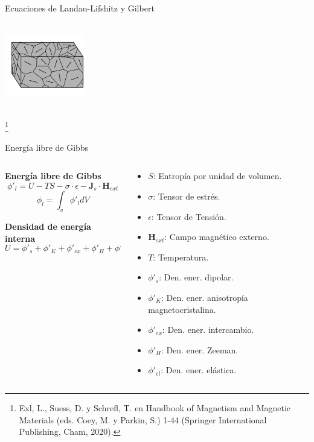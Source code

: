 \documentclass{beamer}
\newcommand\blfootnote[1]{%
  \begingroup
  \renewcommand\thefootnote{}\footnote{#1}%
  \addtocounter{footnote}{-1}%
  \endgroup
}
\begin{document}
\begin{frame}{Ecuaciones de Landau-Lifshitz y Gilbert}
\begin{columns}
\begin{column}{0.5\textwidth}
            \centering
            \includegraphics[width=3.5cm,height=3cm]{../Figuras/MagneticDomain.png}
    \end{column}
    \end{columns}
    \blfootnote{{\tiny Exl, L., Suess, D. y Schrefl, T. en Handbook of Magnetism and Magnetic Materials (eds. Coey, M. y Parkin, S.) 1-44 (Springer International Publishing, Cham, 2020).}}
\end{frame}

\begin{frame}{Energía libre de Gibbs}
        \begin{columns}
    \begin{column}{0.5\textwidth}
    \footnotesize
        \textbf{Energía libre de Gibbs}
        \[ \phi'_l = U - T S - \sigma \cdot \epsilon - \bm{J}_s \cdot \bm{H}_{ext}\]
        \[ \phi_l = \int_v \phi'_l dV \]

        \vspace{0.7cm}
        
        \textbf{Densidad de energía interna}
        \[ U = \phi'_s + \phi'_K + \phi'_{ex} + \phi'_H + \phi'_{el}  \]
    \end{column}
    \begin{column}{0.5\textwidth}
    \scriptsize
        \begin{itemize}
            \item $S$: Entropía por unidad de volumen.
            \item $\sigma$: Tensor de estrés.
            \item $\epsilon$: Tensor de Tensión.
            \item $\bm{H}_{ext}$: Campo magnético externo.
            \item $T$: Temperatura.
        \end{itemize}

        \vspace{0.5cm}
        
        \begin{itemize}
            \item $\phi'_s$: Den. ener. dipolar.
            \item $\phi'_K$: Den. ener. anisotropía magnetocristalina.
            \item $\phi'_{ex}$:  Den. ener. intercambio.
            \item $\phi'_H$: Den. ener. Zeeman.
            \item $\phi'_{el}$: Den. ener. elástica.
        \end{itemize}
    \end{column}
    \end{columns}
    

\end{frame}
\end{document}
